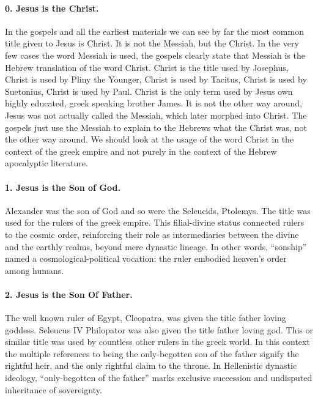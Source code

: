 \paragraph{0.
Jesus is the Christ.}\label{par:jesus-is-the-christ.}
In the gospels and all the earliest materials we can see by far the most common title given to Jesus is Christ.
It is not the Messiah, but the Christ.
In the very few cases the word Messiah is used, the gospels clearly state that Messiah is the Hebrew translation of the word Christ.
Christ is the title used by Josephus, Christ is used by Pliny the Younger, Christ is used by Tacitus, Christ is used by Suetonius, Christ is used by Paul.
Christ is the only term used by Jesus own highly educated, greek speaking brother James.
It is not the other way around, Jesus was not actually called the Messiah, which later morphed into Christ.
The gospels just use the Messiah to explain to the Hebrews what the Christ was, not the other way around.
We should look at the usage of the word Christ in the context of the greek empire and not purely in the context of the Hebrew apocalyptic literature.

\paragraph{1.
Jesus is the Son of God.}\label{par:jesus-is-the-son-of-god.}
Alexander was the son of God and so were the Seleucids, Ptolemys.
The title was used for the rulers of the greek empire.
This filial-divine status connected rulers to the cosmic order, reinforcing their role as intermediaries between the divine and the earthly realms, beyond mere dynastic lineage.
In other words, “sonship” named a cosmological-political vocation: the ruler embodied heaven’s order among humans.

\paragraph{2.
Jesus is the Son Of Father.}\label{par:jesus-is-the-son-of-father.}

The well known ruler of Egypt, Cleopatra, was given the title father loving goddess.
Seleucus IV Philopator was also given the title father loving god.
This or similar title was used by countless other rulers in the greek world.
In this context the multiple references to being the only-begotten son of the father signify the rightful heir, and the only rightful claim to the throne.
In Hellenistic dynastic ideology, “only-begotten of the father” marks exclusive succession and undisputed inheritance of sovereignty.

